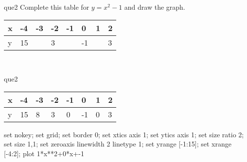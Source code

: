 \documentclass[13.5pt, varwidth=true]{beamer}
\begin{document}
\begin{frame}[shrink=19,fragile]
	\begin{beamercolorbox}[rounded=true, left, shadow=true,wd=14.8cm]{que2}
		 Complete this table for $y = x^{2} - 1$ and draw the graph. \\[0.3cm] \renewcommand{\arraystretch}{1.2}\begin{tabular}{|C|C|C|C|C|C|C|C|} \hline x & -4 & -3 & -2 & -1 & 0 & 1 & 2 \\ \hline y & 15 &  & 3 &  & -1 &  & 3\\ \hline \end{tabular}\\[0.3cm]
	\end{beamercolorbox}
\end{frame}
\begin{frame}[shrink=19,fragile]
	\begin{beamercolorbox}[rounded=true, left, shadow=true,wd=14.8cm]{que2}
		\renewcommand{\arraystretch}{1.2}\begin{tabular}{|C|C|C|C|C|C|C|C|} \hline x & -4 & -3 & -2 & -1 & 0 & 1 & 2 \\ \hline y & 15 & 8 & 3 & 0 & -1 & 0 & 3\\ \hline \end{tabular}\begin{gnuplot}[terminal=pdf] set nokey; set grid; set border 0; set xtics axis 1; set ytics axis 1; set size ratio 2; set size 1,1; set zeroaxis linewidth 2 linetype 1; set yrange [-1:15]; set xrange [-4:2]; plot 1*x**2+0*x+-1 \end{gnuplot}
	\end{beamercolorbox}
\end{frame}
\end{document}
